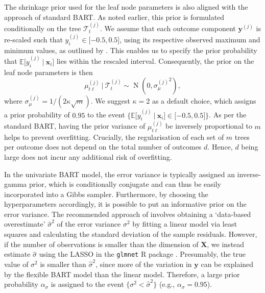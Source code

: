 \documentclass[aoas,preprint]{imsart}
\newcommand\given[1][]{\:#1\vert\:}
\theoremstyle{plain}
\theoremstyle{definition}
\theoremstyle{remark}
\begin{document}
The shrinkage prior used for the leaf node parameters is also aligned with the approach of standard BART. As noted earlier, this prior is formulated conditionally on the tree $\mathcal{T}^{(j)}_t$. We assume that each outcome component $\mathbf{y}^{(j)}$ is re-scaled such that $y^{(j)}_i \in \lbrack -0.5, 0.5\rbrack$, using its respective observed maximum and minimum values, as outlined by \cite{chipman2010bart}. This enables us to specify the prior probability that $\mathbb{E}\lbrack y^{(j)}_i\given\mathbf{x}_i\rbrack$ lies within the rescaled interval. Consequently, the prior on the leaf node parameters is then
\begin{equation}\mu^{(j)}_{t\ell}\given \mathcal{T}^{(j)}_{t} \sim \operatorname{N}\left(0, {\sigma^{(j)}_{\mu}}^{2}\right),\label{eq:mu_prior}
\end{equation}
where $\sigma^{(j)}_{\mu} = 1/(2\kappa\sqrt{m})$. We suggest $\kappa = 2$ as a default choice, which assigns a prior probability of $0.95$ to the event $\{\mathbb{E}\lbrack y_i^{(j)}\given \mathbf{x}_i\rbrack\in \lbrack-0.5, 0.5\rbrack\}$. 
As per the standard BART, having 
the prior variance of $\mu_{t\ell}^{(j)}$ be inversely proportional to $m$ helps to prevent overfitting. Crucially, the regularisation of each set of $m$ trees per outcome does not depend on the total number of outcomes $d$. Hence, $d$ being large does not incur any additional risk of overfitting.

In the univariate BART model, the error variance is typically assigned an inverse-gamma prior, which is conditionally conjugate and can thus be easily incorporated into a Gibbs sampler. Furthermore, by choosing the hyperparameters accordingly, it is possible to put an informative prior on the error variance. The recommended approach of \citet{chipman2010bart} involves obtaining a `data-based overestimate' $\hat{\sigma}^2$ of the error variance $\sigma^2$ by fitting a linear model via least squares and calculating the standard deviation of the sample residuals. However, if the number of observations is smaller than the dimension of $\mathbf{X}$, we instead estimate $\hat{\sigma}$ using the LASSO in the \texttt{glmnet} \textsf{R} package \citep{glmnetR}. Presumably, the true value of  $\sigma^2$ is smaller than $\hat{\sigma}^2$, since more of the variation in $\mathbf{y}$ can be explained by the flexible BART model than the linear model. Therefore, a large prior probability $\alpha_\sigma$ is assigned to the event $\{\sigma^2 < \hat{\sigma}^2\}$ (e.g., $\alpha_\sigma=0.95$).
\end{document}
